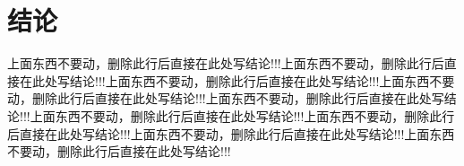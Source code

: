 \newpage
\section*{结论}
上面东西不要动，删除此行后直接在此处写结论!!!上面东西不要动，删除此行后直接在此处写结论!!!上面东西不要动，删除此行后直接在此处写结论!!!上面东西不要动，删除此行后直接在此处写结论!!!上面东西不要动，删除此行后直接在此处写结论!!!上面东西不要动，删除此行后直接在此处写结论!!!上面东西不要动，删除此行后直接在此处写结论!!!上面东西不要动，删除此行后直接在此处写结论!!!上面东西不要动，删除此行后直接在此处写结论!!!



\newpage